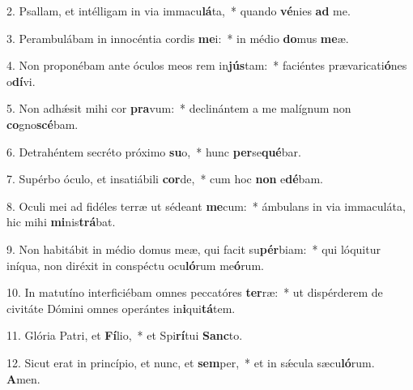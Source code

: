 2. Psallam, et intélligam in via immacu\textbf{lá}ta,~*  quando \textbf{vé}nies \textbf{ad} me.\

3. Perambulábam in innocéntia cordis \textbf{me}i:~*  in médio \textbf{do}mus \textbf{me}æ.\

4. Non proponébam ante óculos meos rem in\textbf{jús}tam:~*  faciéntes prævaricati\textbf{ó}nes o\textbf{dí}vi.\

5. Non adhǽsit mihi cor \textbf{pra}vum:~*  declinántem a me malígnum non \textbf{co}gno\textbf{scé}bam.\

6. Detrahéntem secréto próximo \textbf{su}o,~*  hunc \textbf{per}se\textbf{qué}bar.\

7. Supérbo óculo, et insatiábili \textbf{cor}de,~*  cum hoc \textbf{non} e\textbf{dé}bam.\

8. Oculi mei ad fidéles terræ ut sédeant \textbf{me}cum:~*  ámbulans in via immaculáta, hic mihi \textbf{mi}nis\textbf{trá}bat.\

9. Non habitábit in médio domus meæ, qui facit su\textbf{pér}biam:~*  qui lóquitur iníqua, non diréxit in conspéctu ocu\textbf{ló}rum me\textbf{ó}rum.\

10. In matutíno interficiébam omnes peccatóres \textbf{ter}ræ:~*  ut dispérderem de civitáte Dómini omnes operántes in\textbf{i}qui\textbf{tá}tem.\

11. Glória Patri, et \textbf{Fí}lio,~*  et Spi\textbf{rí}tui \textbf{Sanc}to.\

12. Sicut erat in princípio, et nunc, et \textbf{sem}per,~*  et in sǽcula sæcu\textbf{ló}rum. \textbf{A}men.\

